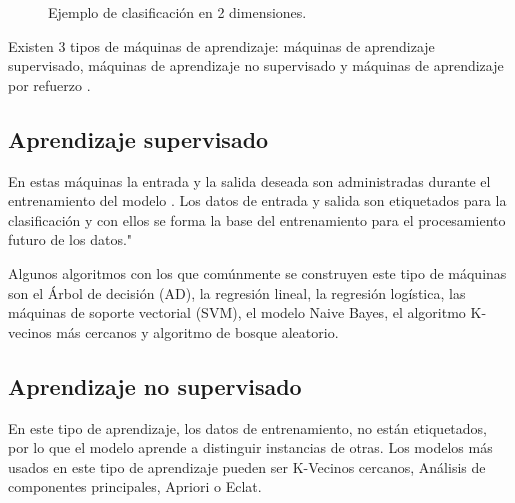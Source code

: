 \documentclass[twoside,spanish,ESP,MSc]{plantillaLabUPV}
\theoremstyle{definition}
\begin{document}
\begin{figure}  
\centering
{}
\caption{Ejemplo de clasificación en 2 dimensiones.}
\label{fig:clplot}  
\end{figure}



Existen 3 tipos de máquinas de aprendizaje: máquinas de aprendizaje supervisado, máquinas de aprendizaje no supervisado y máquinas de aprendizaje por refuerzo \cite{supervisadobook}.


\subsection{Aprendizaje supervisado}

En estas máquinas la entrada y la salida deseada son administradas durante el entrenamiento del modelo  \cite{classifs}. Los datos de entrada y salida son etiquetados para la clasificación y con ellos se forma la base del entrenamiento para el procesamiento futuro de los datos."

Algunos algoritmos con los que comúnmente se construyen este tipo de máquinas son el Árbol de decisión (AD), la regresión lineal, la regresión logística, las máquinas de soporte vectorial (SVM), el modelo Naive Bayes, el algoritmo K-vecinos más cercanos y algoritmo de bosque aleatorio.


\subsection{Aprendizaje no supervisado}

En este tipo de aprendizaje, los datos de entrenamiento, no están etiquetados, por lo que el modelo aprende a distinguir instancias de otras. Los modelos más usados en este tipo de aprendizaje pueden ser K-Vecinos cercanos, Análisis de componentes principales, Apriori o Eclat.
\end{document}
